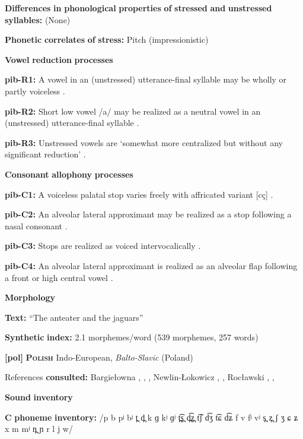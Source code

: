 \begin{styleBody}
\textbf{Differences} \textbf{in} \textbf{phonological} \textbf{properties} \textbf{of} \textbf{stressed} \textbf{and} \textbf{unstressed} \textbf{syllables:} (None)

\textbf{Phonetic} \textbf{correlates} \textbf{of} \textbf{stress:} Pitch (impressionistic)

\textbf{Vowel} \textbf{reduction} \textbf{processes}

\textbf{pib-R1:} A vowel in an (unstressed) utterance-final syllable may be wholly or partly voiceless \citep[23]{Matteson1965}.

\textbf{pib-R2:} Short low vowel /a/ may be realized as a neutral vowel in an (unstressed) utterance-final syllable \citep[23]{Matteson1965}.

\textbf{pib-R3:} Unstressed vowels are ‘somewhat more centralized but without any significant reduction’ \citep[16]{Hanson2010}.

\textbf{Consonant} \textbf{allophony} \textbf{processes}

\textbf{pib-C1:} A voiceless palatal stop varies freely with affricated variant [cç] \citep[17]{Hanson2010}.

\textbf{pib-C2:} An alveolar lateral approximant may be realized as a stop following a nasal consonant \citep[24]{Hanson2010}.

\textbf{pib-C3:} Stops are realized as voiced intervocalically \citep[17]{Hanson2010}.

\textbf{pib-C4:} An alveolar lateral approximant is realized as an alveolar flap following a front or high central vowel \citep[24]{Hanson2010}.

\textbf{Morphology}

\textbf{Text:} “The anteater and the jaguars” \citep[379-386]{Hanson2010}

\textbf{Synthetic} \textbf{index:} 2.1 morphemes/word (539 morphemes, 257 words)

\textbf{[pol]}   \textbf{\textsc{Polish}}  Indo-European, \textit{Balto-Slavic} (Poland)

References \textbf{consulted:} Bargiełowna , \citet{Gussmann2007}, \citet{Jassem2003}, Newlin-Łokowicz , \citet{Nowak2006}, Rocławski , \citet{Rubach1974}, \citet{Zydorowicz2010}

\textbf{Sound} \textbf{inventory}

\textbf{C} \textbf{phoneme} \textbf{inventory:} /p b pʲ bʲ t̪ d̪ k ɡ kʲ ɡʲ t̪͡s̪ d̪͡z̪ t͡ʃ d͡ʒ t͡ɕ d͡ʑ f v fʲ vʲ s̪ z̪ ʃ ʒ ɕ ʑ x m mʲ n̪ ɲ r l j w/


\end{styleBody}
